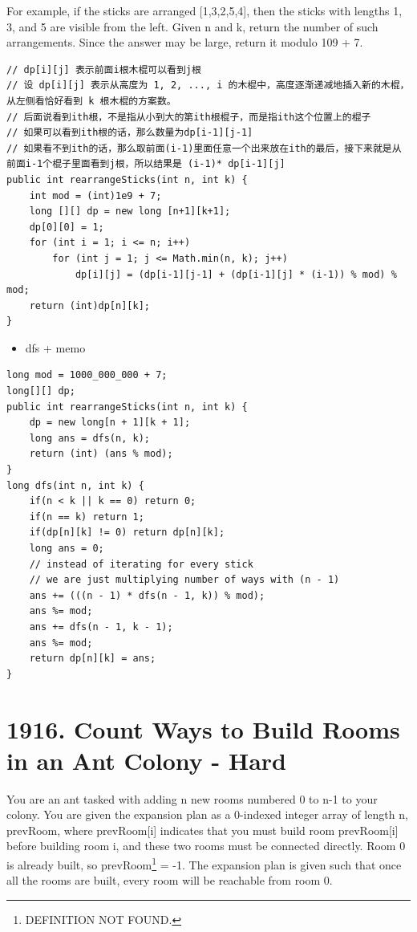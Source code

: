 \documentclass[9pt, b5paaper]{book}
\begin{document}
For example, if the sticks are arranged [1,3,2,5,4], then the sticks with lengths 1, 3, and 5 are visible from the left.
Given n and k, return the number of such arrangements. Since the answer may be large, return it modulo 109 + 7.
\begin{verbatim}
// dp[i][j] 表示前面i根木棍可以看到j根
// 设 dp[i][j] 表示从高度为 1, 2, ..., i 的木棍中，高度逐渐递减地插入新的木棍，从左侧看恰好看到 k 根木棍的方案数。
// 后面说看到ith根，不是指从小到大的第ith根棍子，而是指ith这个位置上的棍子
// 如果可以看到ith根的话，那么数量为dp[i-1][j-1]
// 如果看不到ith的话，那么取前面(i-1)里面任意一个出来放在ith的最后，接下来就是从前面i-1个棍子里面看到j根，所以结果是 (i-1)* dp[i-1][j]
public int rearrangeSticks(int n, int k) {
    int mod = (int)1e9 + 7;
    long [][] dp = new long [n+1][k+1];
    dp[0][0] = 1;
    for (int i = 1; i <= n; i++) 
        for (int j = 1; j <= Math.min(n, k); j++) 
            dp[i][j] = (dp[i-1][j-1] + (dp[i-1][j] * (i-1)) % mod) % mod;
    return (int)dp[n][k];
}
\end{verbatim}
\begin{itemize}
\item dfs + memo
\end{itemize}
\begin{verbatim}
long mod = 1000_000_000 + 7;
long[][] dp;
public int rearrangeSticks(int n, int k) {
    dp = new long[n + 1][k + 1];
    long ans = dfs(n, k);
    return (int) (ans % mod);
}
long dfs(int n, int k) {
    if(n < k || k == 0) return 0;
    if(n == k) return 1;
    if(dp[n][k] != 0) return dp[n][k];
    long ans = 0;
    // instead of iterating for every stick
    // we are just multiplying number of ways with (n - 1)
    ans += (((n - 1) * dfs(n - 1, k)) % mod);
    ans %= mod;
    ans += dfs(n - 1, k - 1);
    ans %= mod;
    return dp[n][k] = ans;
}
\end{verbatim}

\section{1916. Count Ways to Build Rooms in an Ant Colony - Hard}
\label{sec-1-8}
You are an ant tasked with adding n new rooms numbered 0 to n-1 to your colony. You are given the expansion plan as a 0-indexed integer array of length n, prevRoom, where prevRoom[i] indicates that you must build room prevRoom[i] before building room i, and these two rooms must be connected directly. Room 0 is already built, so prevRoom\footnote{DEFINITION NOT FOUND.} = -1. The expansion plan is given such that once all the rooms are built, every room will be reachable from room 0.
\end{document}
